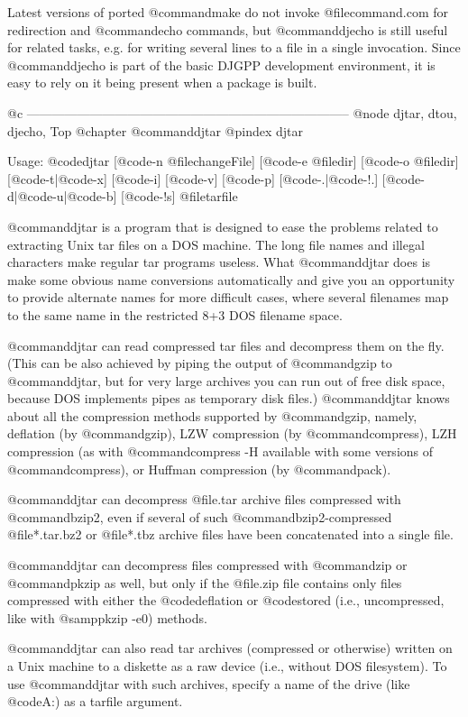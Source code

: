 Latest versions of ported @command{make} do not invoke @file{command.com}
for redirection and @command{echo} commands, but @command{djecho} is still
useful for related tasks, e.g. for writing several lines to a file in a
single invocation.  Since @command{djecho} is part of the basic DJGPP
development environment, it is easy to rely on it being present when a
package is built.

@c -----------------------------------------------------------------------------
@node djtar, dtou, djecho, Top
@chapter @command{djtar}
@pindex djtar

Usage: @code{djtar} [@code{-n} @file{changeFile}] [@code{-e} @file{dir}]
[@code{-o} @file{dir}] [@code{-t}|@code{-x}] [@code{-i}] [@code{-v}]
[@code{-p}] [@code{-.}|@code{-!.}] [@code{-d}|@code{-u}|@code{-b}]
[@code{-!s}]
@file{tarfile}

@command{djtar} is a program that is designed to ease the problems related
to extracting Unix tar files on a DOS machine.  The long file names and
illegal characters make regular tar programs useless.  What @command{djtar}
does is make some obvious name conversions automatically and give you an
opportunity to provide alternate names for more difficult cases, where
several filenames map to the same name in the restricted 8+3 DOS filename
space.

@command{djtar} can read compressed tar files and decompress them on the
fly.  (This can be also achieved by piping the output of @command{gzip} to
@command{djtar}, but for very large archives you can run out of free disk
space, because DOS implements pipes as temporary disk files.)
@command{djtar} knows about all the compression methods supported by
@command{gzip}, namely, deflation (by @command{gzip}), LZW compression
(by @command{compress}), LZH compression (as with @command{compress -H}
available with some versions of @command{compress}), or Huffman compression
(by @command{pack}).

@command{djtar} can decompress @file{.tar} archive files compressed with
@command{bzip2}, even if several of such @command{bzip2}-compressed
@file{*.tar.bz2} or @file{*.tbz} archive files have been concatenated
into a single file.

@command{djtar} can decompress files compressed with @command{zip} or
@command{pkzip} as well, but only if the @file{.zip} file contains only
files compressed with either the @code{deflation} or @code{stored}
(i.e., uncompressed, like with @samp{pkzip -e0}) methods.

@command{djtar} can also read tar archives (compressed or otherwise) written
on a Unix machine to a diskette as a raw device (i.e., without DOS
filesystem).  To use @command{djtar} with such archives, specify a name
of the drive (like @code{A:}) as a tarfile argument.

